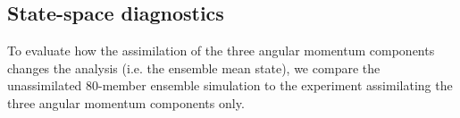 \subsection{State-space diagnostics}
\label{sec:erpda}

To evaluate how the assimilation of the three angular momentum components changes the analysis (i.e. the ensemble mean state), we compare the unassimilated 80-member ensemble simulation to the experiment assimilating the three angular momentum components only. 



